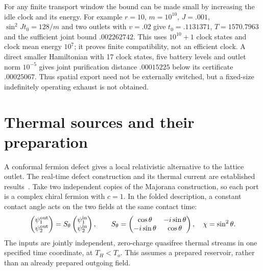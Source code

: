 For any finite transport window the bound can be made small by increasing
the idle clock and its energy. For example $r=10$, $m=10^{10}$, $J=.001$,
$\sin^2 Jt_0=128/m$ and two outlets with $v=.02$ give
$t_0=.1131371$, $T=1570.7963$ and the sufficient joint bound $.002262742$.
This uses $10^{10}+1$ clock states and clock mean energy $10^7$;
it proves finite compatibility, not an efficient clock. A direct smaller
Hamiltonian with 17 clock states, five battery levels and outlet norm
$10^{-5}$ gives joint purification distance $.00015225$ below its
certificate $.00025067$. Thus spatial export need not be externally
switched, but a fixed-size indefinitely operating exhaust is not obtained.

\section{Thermal sources and their preparation}
\label{sec:thermal-contact}

A conformal fermion defect gives a local relativistic alternative to the
lattice outlet. The real-time defect construction and its thermal
current are established results~\cite[Sections~2, 3 and 5]{BernardDoyonViti2015}.
Take two independent copies of the Majorana construction, so each port
is a complex chiral fermion with $c=1$. In the folded description, a
constant contact angle acts on the two fields at the same contact time:
\begin{equation}\label{eq:thermal-contact}
 \begin{pmatrix}\psi_1^{\rm out}\\\psi_2^{\rm out}\end{pmatrix}
 =S_\theta\begin{pmatrix}\psi_1^{\rm in}\\\psi_2^{\rm in}\end{pmatrix},
 \qquad S_\theta=\begin{pmatrix}
 \cos\theta&-i\sin\theta\\-i\sin\theta&\cos\theta
 \end{pmatrix},\quad \chi=\sin^2\theta.
\end{equation}
The inputs are jointly independent, zero-charge quasifree thermal
streams in one specified time coordinate, at $T_H<T_o$. This assumes a
prepared reservoir, rather than an already prepared outgoing field.

